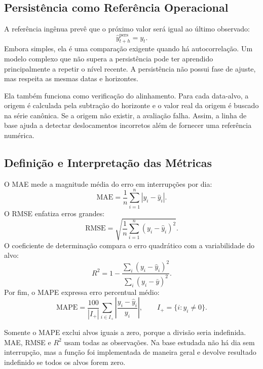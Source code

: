 \subsection{Persistência como Referência Operacional}

A referência ingênua prevê que o próximo valor será igual ao último observado:
\begin{equation}
    \widehat y_{t+h}^{\mathrm{pers}}=y_t.
\end{equation}
Embora simples, ela é uma comparação exigente quando há autocorrelação. Um modelo complexo que não supera a persistência pode ter aprendido principalmente a repetir o nível recente. A persistência não possui fase de ajuste, mas respeita as mesmas datas e horizontes.

Ela também funciona como verificação do alinhamento. Para cada data-alvo, a origem é calculada pela subtração do horizonte e o valor real da origem é buscado na série canônica. Se a origem não existir, a avaliação falha. Assim, a linha de base ajuda a detectar deslocamentos incorretos além de fornecer uma referência numérica.

\subsection{Definição e Interpretação das Métricas}

O MAE mede a magnitude média do erro em interrupções por dia:
\begin{equation}
    \mathrm{MAE}=\frac{1}{n}\sum_{i=1}^{n}|y_i-\widehat y_i|.
\end{equation}
O RMSE enfatiza erros grandes:
\begin{equation}
    \mathrm{RMSE}=\sqrt{\frac{1}{n}\sum_{i=1}^{n}(y_i-\widehat y_i)^2}.
\end{equation}
O coeficiente de determinação compara o erro quadrático com a variabilidade do alvo:
\begin{equation}
    R^2=1-\frac{\sum_i(y_i-\widehat y_i)^2}{\sum_i(y_i-\bar y)^2}.
\end{equation}
Por fim, o MAPE expressa erro percentual médio:
\begin{equation}
    \mathrm{MAPE}=\frac{100}{|I_+|}\sum_{i\in I_+}
    \left|\frac{y_i-\widehat y_i}{y_i}\right|,
    \qquad I_+=\{i:y_i\neq0\}.
\end{equation}

Somente o MAPE exclui alvos iguais a zero, porque a divisão seria indefinida. MAE, RMSE e $R^2$ usam todas as observações. Na base estudada não há dia sem interrupção, mas a função foi implementada de maneira geral e devolve resultado indefinido se todos os alvos forem zero.

